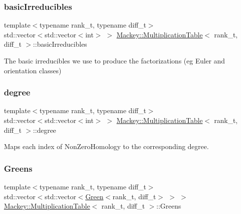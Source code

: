 \subsubsection{\texorpdfstring{basic\+Irreducibles}{basicIrreducibles}}
{\footnotesize\ttfamily template$<$typename rank\+\_\+t, typename diff\+\_\+t$>$ \\
std\+::vector$<$std\+::vector$<$int$>$ $>$ \hyperlink{classMackey_1_1MultiplicationTable}{Mackey\+::\+Multiplication\+Table}$<$ rank\+\_\+t, diff\+\_\+t $>$\+::basic\+Irreducibles\hspace{0.3cm}{\ttfamily [protected]}}



The basic irreducibles we use to produce the factorizations (eg Euler and orientation classes) 

\mbox{\label{classMackey_1_1MultiplicationTable_a9a0d2a2d8561e378e08fcf4929df2cf6}} 
\subsubsection{\texorpdfstring{degree}{degree}}
{\footnotesize\ttfamily template$<$typename rank\+\_\+t, typename diff\+\_\+t$>$ \\
std\+::vector$<$std\+::vector$<$int$>$ $>$ \hyperlink{classMackey_1_1MultiplicationTable}{Mackey\+::\+Multiplication\+Table}$<$ rank\+\_\+t, diff\+\_\+t $>$\+::degree\hspace{0.3cm}{\ttfamily [protected]}}



Maps each index of Non\+Zero\+Homology to the corresponding degree. 

\mbox{\label{classMackey_1_1MultiplicationTable_ac9a42c7d9c520844c0d1c91051ae750e}} 
\subsubsection{\texorpdfstring{Greens}{Greens}}
{\footnotesize\ttfamily template$<$typename rank\+\_\+t, typename diff\+\_\+t$>$ \\
std\+::vector$<$std\+::vector$<$\hyperlink{classMackey_1_1Green}{Green}$<$rank\+\_\+t, diff\+\_\+t$>$ $>$ $>$ \hyperlink{classMackey_1_1MultiplicationTable}{Mackey\+::\+Multiplication\+Table}$<$ rank\+\_\+t, diff\+\_\+t $>$\+::Greens\hspace{0.3cm}{\ttfamily [protected]}}




